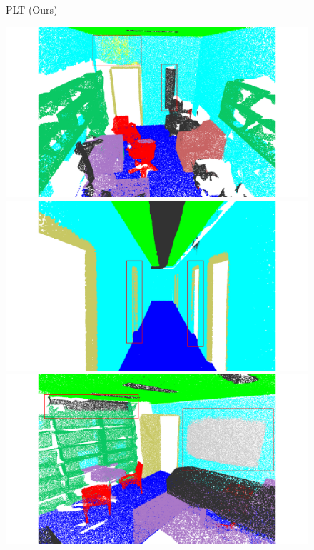 \begin{figure}[htbp]
    \begin{minipage}{0.09\textwidth}
        \centering
        PLT (Ours)
    \end{minipage}
    \hfill
    \begin{minipage}{0.22\textwidth}
        \centering
        \includegraphics[width=\textwidth]{fig/supplement/semantic_segmentation/office_9/PLT_office_9.pdf}
    \end{minipage}
    \hfill
    \begin{minipage}{0.22\textwidth}
        \centering
        \includegraphics[width=\textwidth]{fig/supplement/semantic_segmentation/hallway_10/PLT_hallway_10.pdf}
    \end{minipage}
    \hfill
    \begin{minipage}{0.22\textwidth}
        \centering
        \includegraphics[width=\textwidth]{fig/supplement/semantic_segmentation/office_35/PLT_office_35.pdf}

\end{minipage}
\end{figure}
